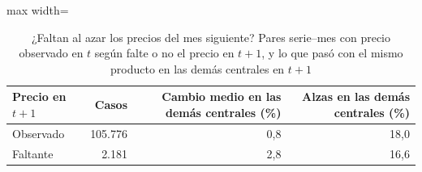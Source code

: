 \begin{table}[htbp]\centering\small
\caption{¿Faltan al azar los precios del mes siguiente? Pares serie--mes con precio observado en $t$ según falte o no el precio en $t+1$, y lo que pasó con el mismo producto en las demás centrales en $t+1$}\label{tab:falt_mecanismo}
\begin{adjustbox}{max width=\textwidth}\begin{tabular}{lrrr}\toprule
Precio en $t+1$ & Casos & Cambio medio en las demás centrales (\%) & Alzas en las demás centrales (\%)\\ \midrule
Observado & 105.776 & 0{,}8 & 18{,}0 \\
Faltante & 2.181 & 2{,}8 & 16{,}6 \\ \bottomrule
\end{tabular}\end{adjustbox}\end{table}
